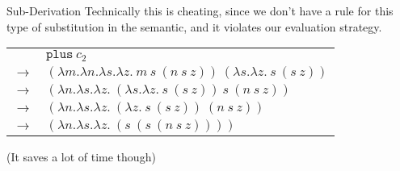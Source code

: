 \documentclass[11pt]{beamer}
\begin{document}
\begin{frame}[fragile=singleslide]{Sub-Derivation}
Technically this is cheating, since we don't have a rule for this type of substitution in the semantic, and it violates our evaluation strategy.
\begin{center}
\begin{tabular}{c l}
& $\texttt{plus}\:c_2$ \\ 
$\rightarrow$ & $(\lambda m. \lambda n. \lambda s. \lambda z.\:m\:s\:(n\:s\:z))\:(\lambda s. \lambda z.\:s\:(s\:z))$ \\ 
$\rightarrow$ & $(\lambda n. \lambda s. \lambda z.\:(\lambda s. \lambda z.\:s\:(s\:z))\:s\:(n\:s\:z))$ \\
$\rightarrow$ & $(\lambda n. \lambda s. \lambda z.\:(\lambda z.\:s\:(s\:z))\:(n\:s\:z))$ \\
$\rightarrow$ & $(\lambda n. \lambda s. \lambda z.\:(s\:(s\:(n\:s\:z))))$ \\
\end{tabular}
\end{center}
(It saves a lot of time though)
\end{frame}
\end{document}
